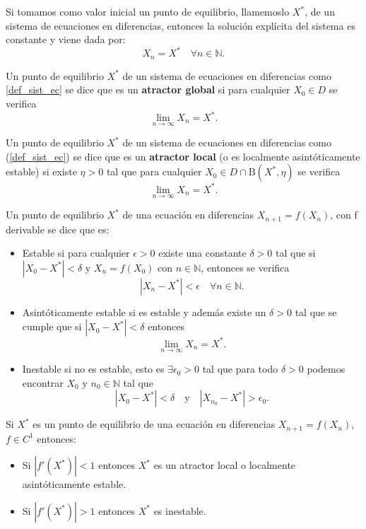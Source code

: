 \begin{proposition}
Si tomamos como valor inicial un punto de equilibrio, llamemoslo $X^*$, de un sistema de ecuaciones en diferencias, entonces la solución explícita del sistema es constante y viene dada por:
$$X_n = X^* \quad \forall n\in\mathbb{N}.$$
\end{proposition}

\begin{definition}
Un punto de equilibrio $X^*$ de un sistema de ecuaciones en diferencias como \eqref{def_sist_ec} se dice que es un \textbf{atractor global} si para cualquier $X_0\in D$ se verifica
$$\displaystyle\lim_{n\to \infty} X_n = X^*.$$
\end{definition}

\begin{definition}
Un punto de equilibrio $X^*$ de un sistema de ecuaciones en diferencias como (\ref{def_sist_ec}) se dice que es un \textbf{atractor local} (o es localmente asintóticamente estable) si existe $\eta>0$ tal que para cualquier $X_0\in D\cap \text{B}(X^*, \eta )$ se verifica
$$\displaystyle\lim_{n\to \infty} X_n = X^*.$$

\end{definition}

\begin{definition}
Un punto de equilibrio $X^*$ de una ecuación en diferencias $X_{n+1}=f(X_n)$, con f derivable se dice que es:
\begin{itemize}
\item Estable si para cualquier $\epsilon > 0$ existe una constante $\delta > 0$ tal que si $|X_0-X^*|<\delta$ y $X_n=f(X_0)$ con $n\in\mathbb{N}$, entonces se verifica
$$|X_n-X^*| < \epsilon \quad \forall n \in\mathbb{N}.$$
\item Asintóticamente estable si es estable y además existe un $\delta > 0$ tal que se cumple que  si $|X_0-X^*|<\delta$ entonces
$$\lim_{n\rightarrow\infty} X_n = X^*.$$
\item Inestable si no es estable, esto es $\exists \epsilon_0 >0$ tal que para todo $\delta >0$ podemos encontrar $X_0$ y $n_0\in\mathbb{N}$ tal que
$$|X_0-X^*|<\delta \quad \text{y} \quad |X_{n_0}-X^*|>\epsilon_0.$$
\end{itemize}
\end{definition}

\begin{proposition}
Si $X^*$ es un punto de equilibrio de una ecuación en diferencias $X_{n+1}=f(X_n)$, $f\in C^1$ entonces:
\begin{itemize}
\item Si $|f'(X^*)|<1$ entonces $X^*$ es un atractor local o localmente asintóticamente estable.
\item Si $|f'(X^*)|>1$ entonces $X^*$ es inestable.
\end{itemize}
\end{proposition}

